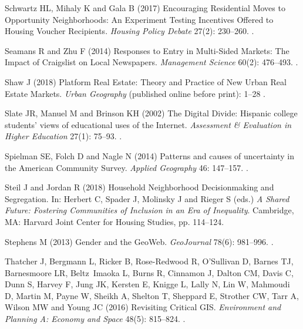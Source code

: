 \documentclass[11pt,letterpaper]{article}
\begin{document}
\begin{thebibliography}{77}
	Schwartz HL, Mihaly K and Gala B (2017) Encouraging {Residential} {Moves} to
	{Opportunity} {Neighborhoods}: {An} {Experiment} {Testing} {Incentives}
	{Offered} to {Housing} {Voucher} {Recipients}.
	\newblock \emph{Housing Policy Debate} 27(2): 230--260.
	\newblock {}.
	
	Seamans R and Zhu F (2014) Responses to {Entry} in {Multi}-{Sided} {Markets}:
	{The} {Impact} of {Craigslist} on {Local} {Newspapers}.
	\newblock \emph{Management Science} 60(2): 476--493.
	\newblock {}.
	
	Shaw J (2018) Platform {Real} {Estate}: {Theory} and {Practice} of {New}
	{Urban} {Real} {Estate} {Markets}.
	\newblock \emph{Urban Geography} (published online before print): 1--28 .
	
	Slate JR, Manuel M and Brinson KH (2002) The {Digital} {Divide}: {Hispanic}
	college students' views of educational uses of the {Internet}.
	\newblock \emph{Assessment \& Evaluation in Higher Education} 27(1): 75--93.
	\newblock {}.
	
	Spielman SE, Folch D and Nagle N (2014) Patterns and causes of uncertainty in
	the {American} {Community} {Survey}.
	\newblock \emph{Applied Geography} 46: 147--157.
	\newblock {}.
	
	Steil J and Jordan R (2018) Household {Neighborhood} {Decisionmaking} and
	{Segregation}.
	\newblock In: Herbert C, Spader J, Molinsky J and Rieger S (eds.) \emph{A
		{Shared} {Future}: {Fostering} {Communities} of {Inclusion} in an {Era} of
		{Inequality}}. Cambridge, MA: Harvard Joint Center for Housing Studies, pp.
	114--124.
	
	Stephens M (2013) Gender and the {GeoWeb}.
	\newblock \emph{GeoJournal} 78(6): 981--996.
	\newblock {}.
	
	Thatcher J, Bergmann L, Ricker B, Rose-Redwood R, O'Sullivan D, Barnes TJ,
	Barnesmoore LR, Beltz~Imaoka L, Burns R, Cinnamon J, Dalton CM, Davis C, Dunn
	S, Harvey F, Jung JK, Kersten E, Knigge L, Lally N, Lin W, Mahmoudi D, Martin
	M, Payne W, Sheikh A, Shelton T, Sheppard E, Strother CW, Tarr A, Wilson MW
	and Young JC (2016) Revisiting {Critical} {GIS}.
	\newblock \emph{Environment and Planning A: Economy and Space} 48(5): 815--824.
	\newblock {}.
	

\end{thebibliography}
\end{document}
